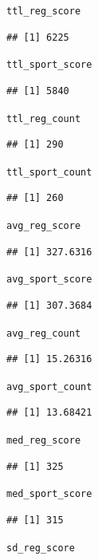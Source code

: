 \documentclass{article}\usepackage[]{graphicx}\usepackage[]{xcolor}
\makeatletter
\newcommand{\hlstd}[1]{\textcolor[rgb]{0.345,0.345,0.345}{#1}}%
\newenvironment{kframe}{%
 \def\at@end@of@kframe{}%
 \ifinner\ifhmode%
  \def\at@end@of@kframe{\end{minipage}}%
  \begin{minipage}{\columnwidth}%
 \fi\fi%
 \def\FrameCommand##1{\hskip\@totalleftmargin \hskip-\fboxsep
 \colorbox{shadecolor}{##1}\hskip-\fboxsep
     \hskip-\linewidth \hskip-\@totalleftmargin \hskip\columnwidth}%
 \MakeFramed {\advance\hsize-\width
   \@totalleftmargin\z@ \linewidth\hsize
   \@setminipage}}%
 {\par\unskip\endMakeFramed%
 \at@end@of@kframe}
\newenvironment{knitrout}{}{} %
\makeatother
\begin{document}
\begin{knitrout}
\begin{kframe}
\begin{alltt}
\hlstd{ttl_reg_score}
\end{alltt}
\begin{verbatim}
## [1] 6225
\end{verbatim}
\begin{alltt}
\hlstd{ttl_sport_score}
\end{alltt}
\begin{verbatim}
## [1] 5840
\end{verbatim}
\begin{alltt}
\hlstd{ttl_reg_count}
\end{alltt}
\begin{verbatim}
## [1] 290
\end{verbatim}
\begin{alltt}
\hlstd{ttl_sport_count}
\end{alltt}
\begin{verbatim}
## [1] 260
\end{verbatim}
\begin{alltt}
\hlstd{avg_reg_score}
\end{alltt}
\begin{verbatim}
## [1] 327.6316
\end{verbatim}
\begin{alltt}
\hlstd{avg_sport_score}
\end{alltt}
\begin{verbatim}
## [1] 307.3684
\end{verbatim}
\begin{alltt}
\hlstd{avg_reg_count}
\end{alltt}
\begin{verbatim}
## [1] 15.26316
\end{verbatim}
\begin{alltt}
\hlstd{avg_sport_count}
\end{alltt}
\begin{verbatim}
## [1] 13.68421
\end{verbatim}
\begin{alltt}
\hlstd{med_reg_score}
\end{alltt}
\begin{verbatim}
## [1] 325
\end{verbatim}
\begin{alltt}
\hlstd{med_sport_score}
\end{alltt}
\begin{verbatim}
## [1] 315
\end{verbatim}
\begin{alltt}
\hlstd{sd_reg_score}
\end{alltt}

\end{kframe}
\end{knitrout}
\end{document}
